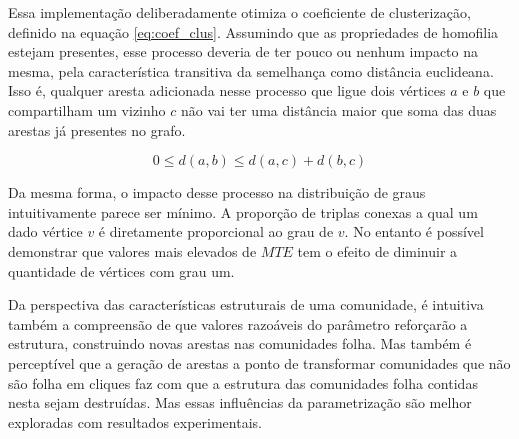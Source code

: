 \documentclass[notes.tex]{subfiles}
\begin{document}
Essa implementação deliberadamente otimiza o coeficiente de clusterização, definido na equação \ref{eq:coef_clus}.
Assumindo que as propriedades de homofilia estejam presentes, esse processo deveria de ter pouco ou nenhum impacto na mesma, pela característica transitiva da semelhança como distância euclideana.
Isso é, qualquer aresta adicionada nesse processo que ligue dois vértices  $a$ e  $b$ que compartilham um vizinho  $c$ não vai ter uma distância maior que soma das duas arestas já presentes no grafo.

\begin{equation}
0 \le d(a, b) \le d(a, c) + d(b, c)
\end{equation}

Da mesma forma, o impacto desse processo na distribuição de graus intuitivamente parece ser mínimo.
A proporção de triplas conexas a qual um dado vértice $v$ é diretamente proporcional ao grau de $v$. 
No entanto é possível demonstrar que valores mais elevados de $MTE$ tem o efeito de diminuir a quantidade de vértices com grau um.

Da perspectiva das características estruturais de uma comunidade, é intuitiva também a compreensão de que valores razoáveis do parâmetro reforçarão a estrutura, construindo novas arestas nas comunidades folha.
Mas também é perceptível que a geração de arestas a ponto de transformar comunidades que não são folha em cliques faz com que a estrutura das comunidades folha contidas nesta sejam destruídas.
Mas essas influências da parametrização são melhor exploradas com resultados experimentais.
\end{document}

